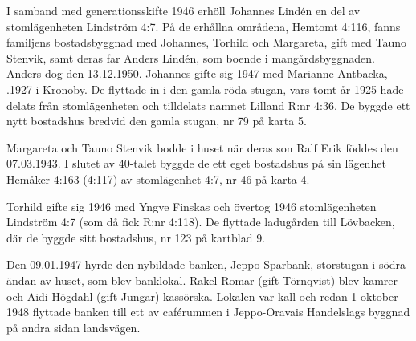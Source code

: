 I samband med generationsskifte 1946 erhöll Johannes Lindén en del av stomlägenheten Lindström 4:7. På de erhållna områdena, Hemtomt 4:116, fanns familjens bostadsbyggnad med Johannes, Torhild och Margareta, gift med Tauno Stenvik, samt deras far Anders Lindén, som boende i mangårdsbyggnaden. Anders dog den 13.12.1950. Johannes gifte sig 1947 med Marianne Antbacka, .1927 i Kronoby. De flyttade in i den gamla röda stugan, vars tomt år 1925 hade delats från stomlägenheten och tilldelats namnet Lilland R:nr 4:36. De byggde ett nytt bostadshus bredvid den gamla stugan, nr 79 på karta 5.

Margareta och Tauno Stenvik bodde i huset när deras son Ralf Erik föddes den 07.03.1943. I slutet av 40-talet byggde de ett eget bostadshus på sin lägenhet Hemåker 4:163 (4:117) av stomlägenhet 4:7, nr 46 på karta 4.

Torhild gifte sig 1946 med Yngve Finskas och övertog 1946 stomlägenheten Lindström 4:7 (som då fick R:nr 4:118). De flyttade ladugården till Lövbacken, där de byggde sitt bostadshus, nr 123 på kartblad 9.

Den 09.01.1947 hyrde den nybildade banken, Jeppo Sparbank, storstugan i södra ändan av huset, som blev banklokal. Rakel Romar (gift Törnqvist) blev kamrer och Aidi Högdahl (gift Jungar) kassörska. Lokalen var kall och redan 1 oktober 1948 flyttade banken till ett av caférummen i Jeppo-Oravais Handelslags byggnad på andra sidan landsvägen.



